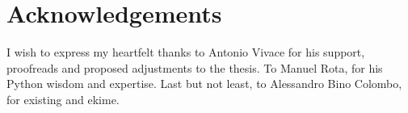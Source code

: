 
\section*{Acknowledgements}\label{section:acknowledgements}

I wish to express my heartfelt thanks to Antonio Vivace for his support, proofreads and proposed adjustments to the thesis.
To Manuel Rota, for his Python wisdom and expertise.
Last but not least, to Alessandro Bino Colombo, for existing and ekime.

